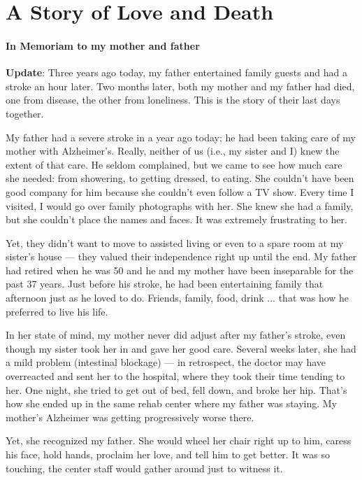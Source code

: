 \section{A Story of Love and Death}

\paragraph{In Memoriam to my mother and father}


\textbf{Update}: Three years ago today, my father entertained family guests and had a stroke an hour later. Two months later, both my mother and my father had died, one from disease, the other from loneliness. This is the story of their last days together.

My father had a severe stroke in a year ago today; he had been taking care of my mother with Alzheimer's. Really, neither of us (i.e., my sister and I) knew the extent of that care. He seldom complained, but we came to see how much care she needed: from showering, to getting dressed, to eating. She couldn't have been good company for him because she couldn't even follow a TV show. Every time I visited, I would go over family photographs with her. She knew she had a family, but she couldn't place the names and faces. It was extremely frustrating to her.

Yet, they didn't want to move to assisted living or even to a spare room at my sister's house --- they valued their independence right up until the end. My father had retired when he was 50 and he and my mother have been inseparable for the past 37 years. Just before his stroke, he had been entertaining family that afternoon just as he loved to do. Friends, family, food, drink ... that was how he preferred to live his life.

In her state of mind, my mother never did adjust after my father's stroke, even though my sister took her in and gave her good care. Several weeks later, she had a mild problem (intestinal blockage) --- in retrospect, the doctor may have overreacted and sent her to the hospital, where they took their time tending to her. One night, she tried to get out of bed, fell down, and broke her hip. That's how she ended up in the same rehab center where my father was staying. My mother's Alzheimer was getting progressively worse there.

Yet, she recognized my father. She would wheel her chair right up to him, caress his face, hold hands, proclaim her love, and tell him to get better. It was so touching, the center staff would gather around just to witness it.

